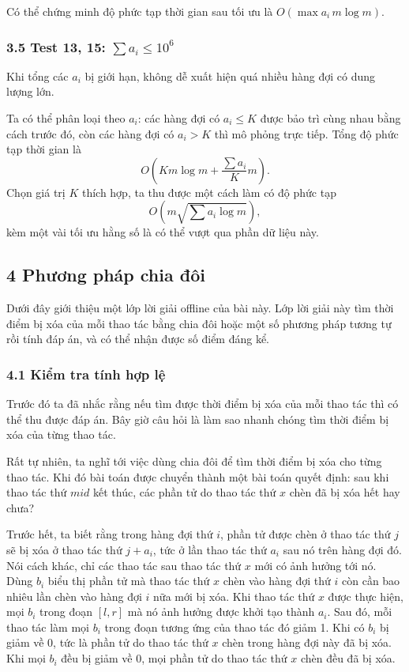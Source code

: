 \documentclass[11pt]{article}
\begin{document}
Có thể chứng minh độ phức tạp thời gian sau tối ưu là \(O(\max a_i\,m\log m)\).

\subsubsection*{3.5 Test 13, 15: \(\sum a_i\le 10^6\)}

Khi tổng các \(a_i\) bị giới hạn, không dễ xuất hiện quá nhiều hàng đợi có dung
lượng lớn.

Ta có thể phân loại theo \(a_i\): các hàng đợi có \(a_i\le K\) được bảo trì
cùng nhau bằng cách trước đó, còn các hàng đợi có \(a_i>K\) thì mô phỏng trực
tiếp. Tổng độ phức tạp thời gian là
\[
  O\left(Km\log m+\frac{\sum a_i}{K}m\right).
\]
Chọn giá trị \(K\) thích hợp, ta thu được một cách làm có độ phức tạp
\[
  O\left(m\sqrt{\sum a_i\log m}\right),
\]
kèm một vài tối ưu hằng số là có thể vượt qua phần dữ liệu này.

\subsection*{4 Phương pháp chia đôi}

Dưới đây giới thiệu một lớp lời giải offline của bài này. Lớp lời giải này tìm
thời điểm bị xóa của mỗi thao tác bằng chia đôi hoặc một số phương pháp tương tự
rồi tính đáp án, và có thể nhận được số điểm đáng kể.

\subsubsection*{4.1 Kiểm tra tính hợp lệ}

Trước đó ta đã nhắc rằng nếu tìm được thời điểm bị xóa của mỗi thao tác thì có
thể thu được đáp án. Bây giờ câu hỏi là làm sao nhanh chóng tìm thời điểm bị xóa
của từng thao tác.

Rất tự nhiên, ta nghĩ tới việc dùng chia đôi để tìm thời điểm bị xóa cho từng
thao tác. Khi đó bài toán được chuyển thành một bài toán quyết định: sau khi
thao tác thứ \(\mathit{mid}\) kết thúc, các phần tử do thao tác thứ \(x\) chèn
đã bị xóa hết hay chưa?

Trước hết, ta biết rằng trong hàng đợi thứ \(i\), phần tử được chèn ở thao tác
thứ \(j\) sẽ bị xóa ở thao tác thứ \(j+a_i\), tức ở lần thao tác thứ \(a_i\) sau
nó trên hàng đợi đó. Nói cách khác, chỉ các thao tác sau thao tác thứ \(x\) mới
có ảnh hưởng tới nó. Dùng \(b_i\) biểu thị phần tử mà thao tác thứ \(x\) chèn
vào hàng đợi thứ \(i\) còn cần bao nhiêu lần chèn vào hàng đợi \(i\) nữa mới bị
xóa. Khi thao tác thứ \(x\) được thực hiện, mọi \(b_i\) trong đoạn \([l,r]\) mà
nó ảnh hưởng được khởi tạo thành \(a_i\). Sau đó, mỗi thao tác làm mọi \(b_i\)
trong đoạn tương ứng của thao tác đó giảm 1. Khi có \(b_i\) bị giảm về 0, tức là
phần tử do thao tác thứ \(x\) chèn trong hàng đợi này đã bị xóa. Khi mọi \(b_i\)
đều bị giảm về 0, mọi phần tử do thao tác thứ \(x\) chèn đều đã bị xóa.
\end{document}
